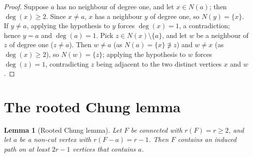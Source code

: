 \documentclass[11pt]{article}
\newtheorem{lemma}[theorem]{Lemma}
\theoremstyle{definition}
\begin{document}
\begin{proof}
Suppose $a$ has no neighbour of degree one, and let $x\in N(a)$; then
$\deg(x)\ge2$.  Since $x\ne a$, $x$ has a neighbour $y$ of degree one, so
$N(y)=\{x\}$.  If $y\ne a$, applying the hypothesis to $y$ forces $\deg(x)=1$,
a contradiction; hence $y=a$ and $\deg(a)=1$.  Pick
$z\in N(x)\setminus\{a\}$, and let $w$ be a neighbour of $z$ of degree one
($z\ne a$).  Then $w\ne a$ (as $N(a)=\{x\}\not\ni z$) and $w\ne x$ (as
$\deg(x)\ge2$), so $N(w)=\{z\}$; applying the hypothesis to $w$ forces
$\deg(z)=1$, contradicting $z$ being adjacent to the two distinct vertices
$x$ and $w$.
\end{proof}

\section{The rooted Chung lemma}\label{sec:chung}

\begin{lemma}[Rooted Chung lemma]\label{lem:rooted-chung}
Let $F$ be connected with $r(F)=r\ge2$, and let $a$ be a non-cut vertex with
$r(F-a)=r-1$.  Then $F$ contains an induced path on at least $2r-1$ vertices
that contains $a$.
\end{lemma}
\end{document}
